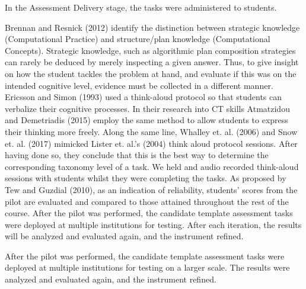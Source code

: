 In the Assessment Delivery stage, the tasks were administered to students.



Brennan and Resnick (2012) identify the distinction between strategic knowledge (Computational Practice) and structure/plan knowledge (Computational Concepts). Strategic knowledge, such as algorithmic plan composition strategies can rarely be deduced by merely inspecting a given answer. Thus, to give insight on how the student tackles the problem at hand, and evaluate if this was on the intended cognitive level, evidence must be collected in a different manner.  Ericsson and Simon (1993) used a think-aloud protocol so that students can verbalize their cognitive processes. In their research into CT skills Atmatzidou and Demetriadis (2015) employ the same method to allow students to express their thinking more freely. Along the same line, Whalley et. al. (2006) and Snow et. al. (2017) mimicked Lister et. al.'s (2004) think aloud protocol sessions. After having done so, they conclude that this is the best way to determine the corresponding taxonomy level of a task. We held and audio recorded think-aloud sessions with students whilst they were completing the tasks. As proposed by Tew and Guzdial (2010), as an indication of reliability, students' scores from the pilot are evaluated and compared to those attained throughout the rest of the course. After the pilot was performed, the candidate template assessment tasks were deployed at multiple institutions for testing. After each iteration, the results will be analyzed and evaluated again, and the instrument refined.

After the pilot was performed, the  candidate template assessment tasks were deployed at multiple institutions for testing on a larger scale. The results were analyzed and evaluated again, and the instrument refined.

